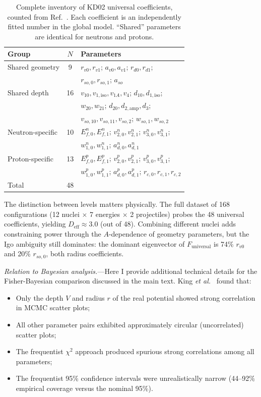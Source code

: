 \documentclass[aps,prl,reprint,superscriptaddress,showpacs]{revtex4-2}
\begin{document}
\begin{table}[h]
\caption{Complete inventory of KD02 universal coefficients, counted from Ref.~\cite{Koning2003}. Each coefficient is an independently fitted number in the global model. ``Shared'' parameters are identical for neutrons and protons.}
\label{tab:kd02_params}
\begin{ruledtabular}
\begin{tabular}{lcl}
Group & $N$ & Parameters \\
\hline
Shared geometry & 9 & $r_{v0}, r_{v1}$; $a_{v0}, a_{v1}$; $r_{d0}, r_{d1}$; \\
 & & $r_{so,0}, r_{so,1}$; $a_{so}$ \\
Shared depth & 16 & $v_{10}, v_{1,\mathrm{iso}}, v_{1A}, v_4$; $d_{10}, d_{1,\mathrm{iso}}$; \\
 & & $w_{20}, w_{21}$; $d_{20}, d_{2,\mathrm{amp}}, d_3$; \\
 & & $v_{so,10}, v_{so,11}, v_{so,2}$; $w_{so,1}, w_{so,2}$ \\
Neutron-specific & 10 & $E_{f,0}^n, E_{f,1}^n$; $v_{2,0}^n, v_{2,1}^n$; $v_{3,0}^n, v_{3,1}^n$; \\
 & & $w_{1,0}^n, w_{1,1}^n$; $a_{d,0}^n, a_{d,1}^n$ \\
Proton-specific & 13 & $E_{f,0}^p, E_{f,1}^p$; $v_{2,0}^p, v_{2,1}^p$; $v_{3,0}^p, v_{3,1}^p$; \\
 & & $w_{1,0}^p, w_{1,1}^p$; $a_{d,0}^p, a_{d,1}^p$; $r_{c,0}, r_{c,1}, r_{c,2}$ \\
\hline
Total & 48 & \\
\end{tabular}
\end{ruledtabular}
\end{table}

The distinction between levels matters physically. The full dataset of 168 configurations (12 nuclei $\times$ 7 energies $\times$ 2 projectiles) probes the 48 universal coefficients, yielding $D_\mathrm{eff} \approx 3.0$ (out of 48). Combining different nuclei adds constraining power through the $A$-dependence of geometry parameters, but the Igo ambiguity still dominates: the dominant eigenvector of $F_\mathrm{universal}$ is 74\% $r_{v0}$ and 20\% $r_{so,0}$, both radius coefficients.

\textit{Relation to Bayesian analysis.}---Here I provide additional technical details for the Fisher-Bayesian comparison discussed in the main text. King \textit{et al.}~\cite{King2019PRL} found that:
\begin{itemize}
\item Only the depth $V$ and radius $r$ of the real potential showed strong correlation in MCMC scatter plots;
\item All other parameter pairs exhibited approximately circular (uncorrelated) scatter plots;
\item The frequentist $\chi^2$ approach produced spurious strong correlations among all parameters;
\item The frequentist 95\% confidence intervals were unrealistically narrow (44--92\% empirical coverage versus the nominal 95\%).
\end{itemize}
\end{document}
